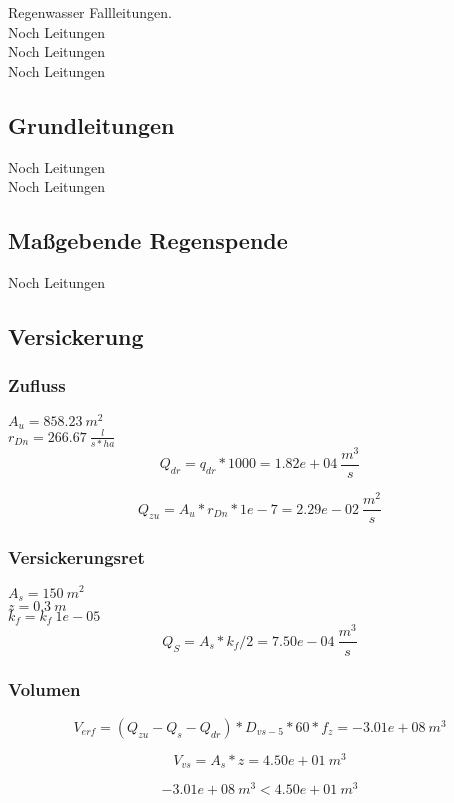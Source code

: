\documentclass[12pt]{report}
\begin{document}
Regenwasser Fallleitungen.\\
Noch Leitungen\\
Noch Leitungen\\
Noch Leitungen\\

\subsection{Grundleitungen}

Noch Leitungen\\
Noch Leitungen\\

\subsection{Maßgebende Regenspende}

Noch Leitungen\\

\subsection{Versickerung}

\subsubsection{Zufluss}

$A_{u} = 858.23 \ m^2$ \\
$r_{Dn} = 266.67 \ \frac{l}{s*ha}$ \\

\begin{equation}
        Q_{dr} = q_{dr} * 1000 = 1.82e+04 \ \frac{m^3}{s}
\end{equation}

\begin{equation}
        Q_{zu} = A_{u} * r_{Dn} * 1e-7 = 2.29e-02 \ \frac{m^2}{s}
\end{equation}

\subsubsection{Versickerungsret}

$A_{s} = 150 \ m^2$ \\
$z = 0.3 \ m$ \\
$k_f = k_{f} \ 1e-05$ \\

\begin{equation}
        Q_S = A_s * k_f / 2 = 7.50e-04 \ \frac{m^3}{s}
\end{equation}

\subsubsection{Volumen}

\begin{equation}
        V_{erf} = (Q_{zu} - Q_{s} - Q_{dr}) * D_{vs-5} * 60 * f_{z} = -3.01e+08 \ m^3
\end{equation}

\begin{equation}
        V_{vs} = A_{s} * z = 4.50e+01 \ m^3
\end{equation}

\begin{equation}
        -3.01e+08 \ m^3 < 4.50e+01 \ m^3
\end{equation}
\end{document}
